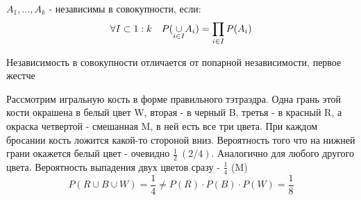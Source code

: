 \documentclass[discrete.tex]{subfiles}
\begin{document}
  \begin{definition}
    $A_1,...,A_k$ - независимы в совокупности, если:
    \[\forall I \subset 1:k \quad P(\underset{i \in I}{\cup}A_i) = \prod_{i \in I} P(A_i)\]
  \end{definition}

  \begin{remark}
    Независимость в совокупности отличается от попарной независимости, первое жестче
  \end{remark}

  \begin{example}[С.Н.Бернштейн]
    Рассмотрим игральную кость в форме правильного тэтраэдра. Одна грань этой кости окрашена в белый цвет W, вторая - в черный B, третья - в красный R, а окраска четвертой - смешанная M, в ней есть все три цвета. При каждом бросании кость ложится какой-то стороной вниз. Вероятность того что на нижней грани окажется белый цвет - очевидно $\frac{1}{2}\ (2/4)$. Аналогично для любого другого цвета. Вероятность выпадения двух цветов сразу - $\frac{1}{4}$ (M)
    \[P(R \cup B \cup W) = \frac{1}{4} \neq P(R) \cdot P(B) \cdot P(W) = \frac{1}{8}\]
  \end{example}
\end{document}
